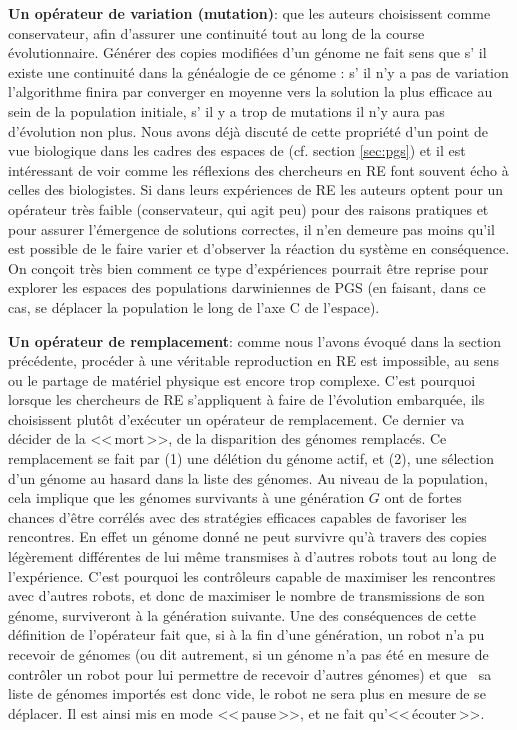 \textbf{Un opérateur de variation (mutation)}: que les auteurs choisissent comme conservateur, afin d'assurer une continuité tout au long de la course évolutionnaire. Générer des copies modifiées d'un génome ne fait sens que s' il existe une continuité dans la généalogie de ce génome : s' il n'y a pas de variation l'algorithme finira par converger en moyenne vers la solution la plus efficace au sein de la population initiale, s' il y a trop de mutations il n'y aura pas d'évolution non plus. Nous avons déjà discuté de cette propriété d'un point de vue biologique dans les cadres des espaces de \cite{godfrey2009darwinian} (cf. section \ref{sec:pgs}) et il est intéressant de voir comme les réflexions des chercheurs en RE font souvent écho à celles des biologistes. Si dans leurs expériences de RE les auteurs optent pour un opérateur très faible (conservateur, qui agit peu) pour des raisons pratiques et pour assurer l'émergence de solutions correctes, il n'en demeure pas moins qu'il est possible de le faire varier et d'observer la réaction du système en conséquence. On conçoit très bien comment ce type d'expériences pourrait être reprise pour explorer les espaces des populations darwiniennes de PGS (en faisant, dans ce cas, se déplacer la population le long de l'axe C de l'espace).

\textbf{Un opérateur de remplacement}: comme nous l'avons évoqué dans la section précédente, procéder à une véritable reproduction en RE est impossible, au sens ou le partage de matériel physique est encore trop complexe. C'est pourquoi lorsque les chercheurs de RE s'appliquent à faire de l'évolution embarquée, ils choisissent plutôt d'exécuter un opérateur de remplacement. Ce dernier va décider de la <<\,mort\,>>, de la disparition des génomes remplacés. Ce remplacement se fait par (1) une délétion du génome actif, et (2), une sélection d'un génome au hasard dans la liste des génomes. Au niveau de la population, cela implique que les génomes survivants à une génération $G$ ont de fortes chances d'être corrélés avec des stratégies efficaces capables de favoriser les rencontres. En effet un génome donné ne peut survivre qu'à travers des copies légèrement différentes de lui même transmises à d'autres robots tout au long de l'expérience. C'est pourquoi les contrôleurs capable de maximiser les rencontres avec d'autres robots, et donc de maximiser le nombre de transmissions de son génome, surviveront à la génération suivante. Une des conséquences de cette définition de l'opérateur fait que, si à la fin d'une génération, un robot n'a pu recevoir de génomes (ou dit autrement, si un génome n'a pas été en mesure de contrôler un robot pour lui permettre de recevoir d'autres génomes) et que  sa liste de génomes importés est donc vide, le robot ne sera plus en mesure de se déplacer. Il est ainsi mis en mode <<\,pause\,>>, et ne fait qu'<<\,écouter\,>>.

